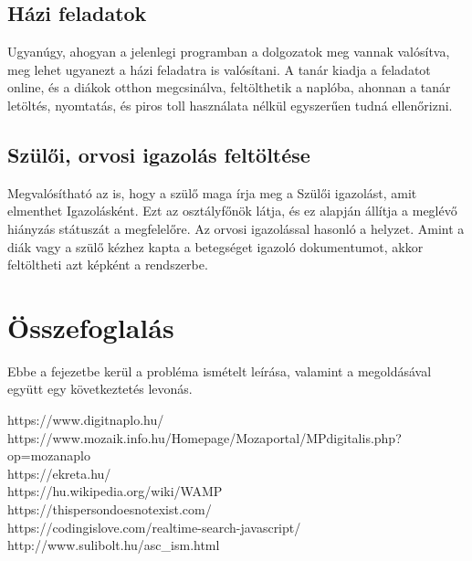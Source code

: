 \documentclass[
]{thesis-ekf}
\begin{document}
\section{Házi feladatok}
Ugyanúgy, ahogyan a jelenlegi programban a dolgozatok meg vannak valósítva, meg lehet ugyanezt a házi feladatra is valósítani. A  tanár kiadja a feladatot online, és a diákok otthon megcsinálva, feltölthetik a naplóba, ahonnan a tanár letöltés, nyomtatás, és piros toll használata nélkül egyszerűen tudná ellenőrizni. 
\section{Szülői, orvosi igazolás feltöltése}
Megvalósítható az is, hogy a szülő maga írja meg a Szülői igazolást, amit elmenthet Igazolásként. Ezt az osztályfőnök látja, és ez alapján állítja a meglévő hiányzás státuszát a megfelelőre. Az orvosi igazolással hasonló a helyzet. Amint a diák vagy a szülő kézhez kapta a betegséget igazoló dokumentumot, akkor feltöltheti azt képként a rendszerbe.
\chapter{Összefoglalás}
Ebbe a fejezetbe kerül a probléma ismételt leírása, valamint a megoldásával együtt egy következtetés levonás.
\begin{thebibliography}{}
	https://www.digitnaplo.hu/\\
	https://www.mozaik.info.hu/Homepage/Mozaportal/MPdigitalis.php?op=mozanaplo\\
	https://ekreta.hu/\\
	https://hu.wikipedia.org/wiki/WAMP\\
	https://thispersondoesnotexist.com/ \\
	https://codingislove.com/realtime-search-javascript/\\
	http://www.sulibolt.hu/asc\_ism.html
\end{thebibliography}
\end{document}
